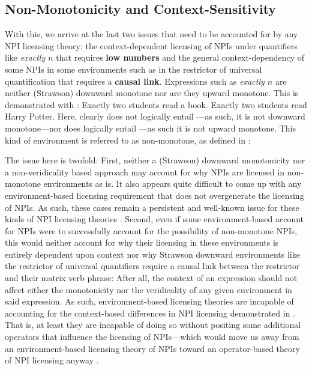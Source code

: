 \subsection{Non-Monotonicity and Context-Sensitivity}
With this, we arrive at the last two issues that need to be accounted for by any NPI licensing theory: the context-dependent licensing of NPIs under quantifiers like \textit{exactly $n$} that requires \textbf{low numbers} and the general context-dependency of some NPIs in some environments such as in the restrictor of universal quantification that requires a \textbf{causal link}. Expressions such as \textit{exactly $n$} are neither (Strawson) downward monotone nor are they upward monotone. This is demonstrated with :
\pex[nopreamble=true]\label{ex:nm-exactly}%
\a{} Exactly two students read a book.
\a{} Exactly two students read Harry Potter.
\xe
Here,  clearly does not logically entail ---as such, it is not downward monotone---nor does  logically entail ---as such it is not upward monotone. This kind of environment is referred to as non-monotone, as defined in :
\ex{}\label{def:nm}%

\xe
The issue here is twofold: First, neither a (Strawson) downward monotonicity nor a non-veridicality based approach may account for why NPIs are licensed in non-monotone environments as is. It also appears quite difficult to come up with any environment-based licensing requirement that does not overgenerate the licensing of NPIs. As such, these cases remain a persistent and well-known issue for these kinds of NPI licensing theories \parencite[see][p.~112, Footnote~1]{Gajewski2011}. Second, even if some environment-based account for NPIs were to successfully account for the possibility of non-monotone NPIs, this would neither account for why their licensing in these environments is entirely dependent upon context nor why Strawson downward environments like the restrictor of universal quantifiers require a causal link between the restrictor and their matrix verb phrase: After all, the context of an expression should not affect either the monotonicity nor the veridicality of any given environment in said expression. As such, environment-based licensing theories are incapable of accounting for the context-based differences in NPI licensing demonstrated in . That is, at least they are incapable of doing so without positing some additional operators that influence the licensing of NPIs---which would move us away from an environment-based licensing theory of NPIs toward an operator-based theory of NPI licensing anyway \parencite{Krifka1995,Chierchia2006,Chierchia2013,Crnic2011,Crnic2014-dogma,Crnic2014-nm}.

